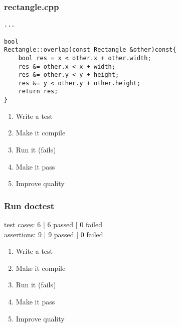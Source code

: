 \begin{frame}[fragile]
\frametitle{rectangle.cpp}
\begin{minipage}[t]{0.48\linewidth}
\begin{lstlisting}
...

bool 
Rectangle::overlap(const Rectangle &other)const{
    bool res = x < other.x + other.width;
    res &= other.x < x + width;
    res &= other.y < y + height;
    res &= y < other.y + other.height;
    return res;
}
\end{lstlisting}
\end{minipage}\hfill
\begin{minipage}[t]{0.28\linewidth}
  \small
  \begin{enumerate} 
    \item \textcolor{deadcolor}{Write a test}
    \item \textcolor{deadcolor}{Make it compile}
    \item \textcolor{deadcolor}{Run it (fails)}
    \item \textcolor{deadcolor}{Make it pass}
    \item \textcolor{activecolor}{Improve quality}
  \end{enumerate} 
\end{minipage}
\end{frame}

\begin{frame}[fragile]
\frametitle{Run doctest}
\begin{minipage}[t]{0.48\linewidth}
test cases: 6 | 6 passed | 0 failed\\
assertions: 9 | 9 passed | 0 failed\\
\end{minipage}\hfill
\begin{minipage}[t]{0.28\linewidth}
  \small
  \begin{enumerate} 
    \item \textcolor{deadcolor}{Write a test}
    \item \textcolor{deadcolor}{Make it compile}
    \item \textcolor{deadcolor}{Run it (fails)}
    \item \textcolor{deadcolor}{Make it pass}
    \item \textcolor{activecolor}{Improve quality}
  \end{enumerate} 
\end{minipage}
\end{frame}


